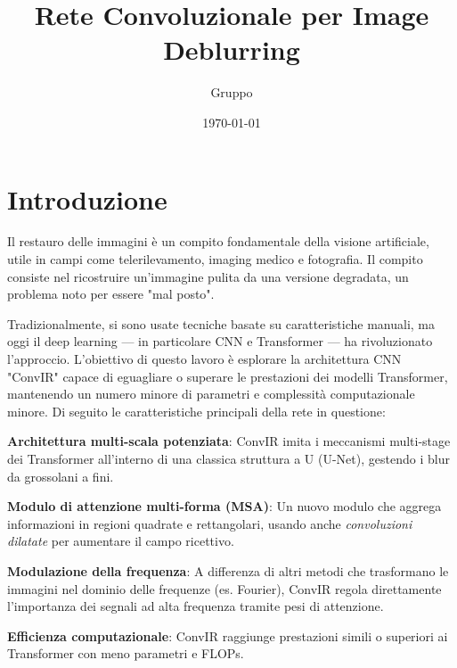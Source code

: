 \documentclass[a4paper,10pt,twocolumn]{article}
\title{\textbf{Rete Convoluzionale per Image Deblurring}}
\author{Gruppo}
\date{\today}
\begin{document}

\section{Introduzione}

Il restauro delle immagini è un compito fondamentale della visione artificiale, utile in campi come telerilevamento,
imaging medico e fotografia. Il compito consiste nel ricostruire un'immagine pulita da una versione degradata,
un problema noto per essere "mal posto".

Tradizionalmente, si sono usate tecniche basate su caratteristiche manuali, ma oggi il deep learning — in particolare CNN e Transformer —
ha rivoluzionato l'approccio.
L'obiettivo di questo lavoro è esplorare la architettura CNN "ConvIR"\cite{convir} capace di eguagliare o superare le prestazioni dei
modelli Transformer, mantenendo un numero minore di parametri e complessit\`a computazionale minore.
Di seguito le caratteristiche principali della rete in questione:

\textbf{Architettura multi-scala potenziata}: \mbox{ConvIR} imita i meccanismi multi-stage dei Transformer all'interno di una classica struttura a U (U-Net),
gestendo i blur da grossolani a fini.

\textbf{Modulo di attenzione multi-forma (MSA)}: Un nuovo modulo che aggrega informazioni in regioni quadrate e rettangolari,
usando anche \textit{convoluzioni dilatate} per aumentare il campo ricettivo.

\textbf{Modulazione della frequenza}: A differenza di altri metodi che trasformano le immagini nel dominio delle frequenze (es. Fourier),
ConvIR regola direttamente l'importanza dei segnali ad alta frequenza tramite pesi di attenzione.

\textbf{Efficienza computazionale}: ConvIR raggiunge prestazioni simili o superiori ai Transformer con meno parametri e FLOPs.
\end{document}
